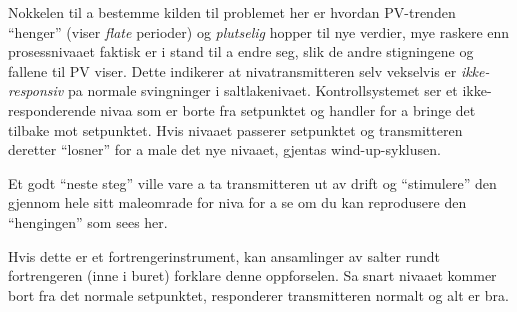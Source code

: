 \vskip 10pt

Nokkelen til a bestemme kilden til problemet her er hvordan PV-trenden ``henger'' (viser {\it flate} perioder) og {\it plutselig} hopper til nye verdier, mye raskere enn prosessnivaaet faktisk er i stand til a endre seg, slik de andre stigningene og fallene til PV viser.  Dette indikerer at nivatransmitteren selv vekselvis er {\it ikke-responsiv} pa normale svingninger i saltlakenivaet.  Kontrollsystemet ser et ikke-responderende nivaa som er borte fra setpunktet og handler for a bringe det tilbake mot setpunktet.  Hvis nivaaet passerer setpunktet og transmitteren deretter ``losner'' for a male det nye nivaaet, gjentas wind-up-syklusen.

\vskip 10pt

Et godt ``neste steg'' ville vare a ta transmitteren ut av drift og ``stimulere'' den gjennom hele sitt maleomrade for niva for a se om du kan reprodusere den ``hengingen'' som sees her.

\vskip 10pt

Hvis dette er et fortrengerinstrument, kan ansamlinger av salter rundt fortrengeren (inne i buret) forklare denne oppforselen.  Sa snart nivaaet kommer bort fra det normale setpunktet, responderer transmitteren normalt og alt er bra.




